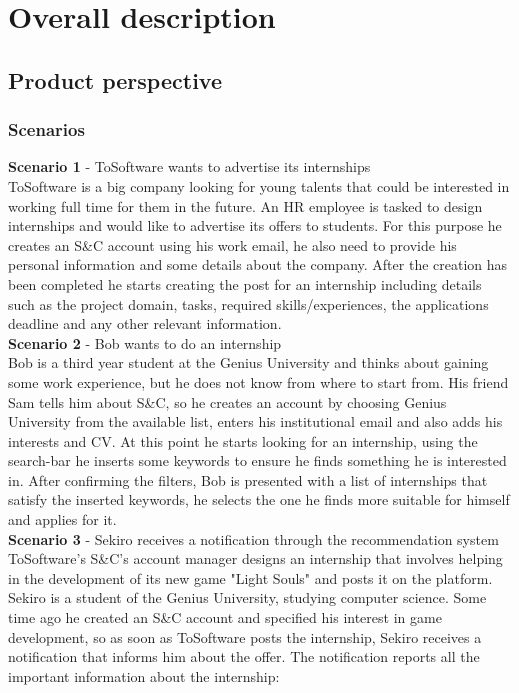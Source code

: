 \documentclass[11pt,twoside]{article}
\begin{document}
\section{Overall description}
	\subsection{Product perspective}
		\subsubsection{Scenarios}
\textbf{\large{Scenario 1}} - ToSoftware wants to advertise its internships \\
ToSoftware is a big company looking for young talents that could be interested in working full time for them in the future. An HR employee is tasked to design internships and would like to advertise its offers to students. For this purpose he creates an S\&C account using his work email, he also need to provide his personal information and some details about the company. After the creation has been completed he starts creating the post for an internship including details such as the project domain, tasks, required skills/experiences, the applications deadline and any other relevant information.
\vspace{1\baselineskip} \\
\textbf{\large{Scenario 2}} - Bob wants to do an internship \\
Bob is a third year student at the Genius University and thinks about gaining some work experience, but he does not know from where to start from. His friend Sam tells him about S\&C, so he creates an account by choosing Genius University from the available list, enters his institutional email and also adds his interests and CV. At this point he starts looking for an internship, using the search-bar he inserts some keywords to ensure he finds something he is interested in. After confirming the filters, Bob is presented with a list of internships that satisfy the inserted keywords, he selects the one he finds more suitable for himself and applies for it.
\vspace{1\baselineskip} \\
\textbf{\large{Scenario 3}} - Sekiro receives a notification through the recommendation system \\
ToSoftware's S\&C's account manager designs an internship that involves helping in the development of its new game "Light Souls" and posts it on the platform. Sekiro is a student of the Genius University, studying computer science. Some time ago he created an S\&C account and specified his interest in game development, so as soon as ToSoftware posts the internship, Sekiro receives a notification that informs him about the offer. The notification reports all the important information about the internship:
\end{document}
